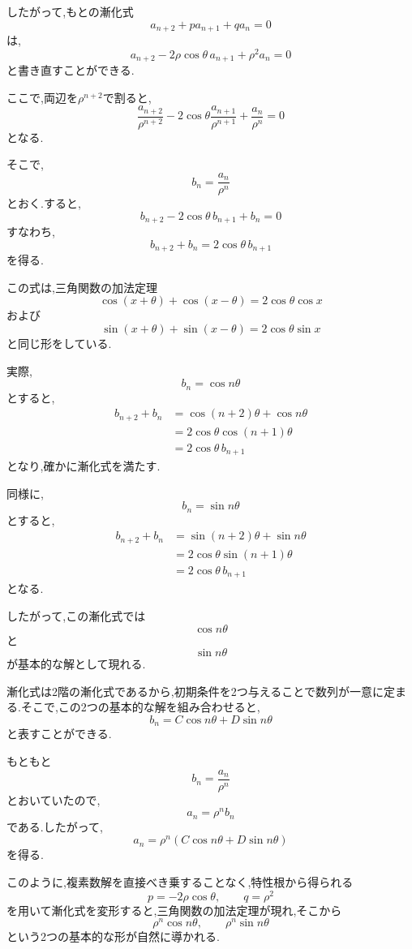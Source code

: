   したがって,もとの漸化式
  \[
    a_{n+2}+pa_{n+1}+qa_n=0
  \]
  は,
  \[
    a_{n+2}
    -2\rho\cos\theta\,a_{n+1}
    +\rho^2a_n=0
  \]
  と書き直すことができる.

  ここで,両辺を$\rho^{n+2}$で割ると,
  \[
    \frac{a_{n+2}}{\rho^{n+2}}
    -2\cos\theta
    \frac{a_{n+1}}{\rho^{n+1}}
    +\frac{a_n}{\rho^n}
    =0
  \]
  となる.

  そこで,
  \[
    b_n=\frac{a_n}{\rho^n}
  \]
  とおく.すると,
  \[
    b_{n+2}
    -2\cos\theta\,b_{n+1}
    +b_n=0
  \]
  すなわち,
  \[
    b_{n+2}+b_n
    =2\cos\theta\,b_{n+1}
  \]
  を得る.

  この式は,三角関数の加法定理
  \[
    \cos(x+\theta)+\cos(x-\theta)
    =2\cos\theta\cos x
  \]
  および
  \[
    \sin(x+\theta)+\sin(x-\theta)
    =2\cos\theta\sin x
  \]
  と同じ形をしている.

  実際,
  \[
    b_n=\cos n\theta
  \]
  とすると,
  \[
  \begin{aligned}
    b_{n+2}+b_n
    &=
    \cos(n+2)\theta+\cos n\theta
  \\
    &=
    2\cos\theta\cos(n+1)\theta
  \\
    &=
    2\cos\theta\,b_{n+1}
  \end{aligned}
  \]
  となり,確かに漸化式を満たす.

  同様に,
  \[
    b_n=\sin n\theta
  \]
  とすると,
  \[
  \begin{aligned}
    b_{n+2}+b_n
    &=
    \sin(n+2)\theta+\sin n\theta
  \\
    &=
    2\cos\theta\sin(n+1)\theta
  \\
    &=
    2\cos\theta\,b_{n+1}
  \end{aligned}
  \]
  となる.

  したがって,この漸化式では
  \[
    \cos n\theta
  \]
  と
  \[
    \sin n\theta
  \]
  が基本的な解として現れる.

  漸化式は2階の漸化式であるから,初期条件を2つ与えることで数列が一意に定まる.そこで,この2つの基本的な解を組み合わせると,
  \[
    b_n=C\cos n\theta+D\sin n\theta
  \]
  と表すことができる.

  もともと
  \[
    b_n=\frac{a_n}{\rho^n}
  \]
  とおいていたので,
  \[
    a_n=\rho^n b_n
  \]
  である.したがって,
  \[
    a_n=\rho^n
    (C\cos n\theta+D\sin n\theta)
  \]
  を得る.

  このように,複素数解を直接べき乗することなく,特性根から得られる
  \[
    p=-2\rho\cos\theta,\qquad q=\rho^2
  \]
  を用いて漸化式を変形すると,三角関数の加法定理が現れ,そこから
  \[
    \rho^n\cos n\theta,\qquad
    \rho^n\sin n\theta
  \]
  という2つの基本的な形が自然に導かれる.


